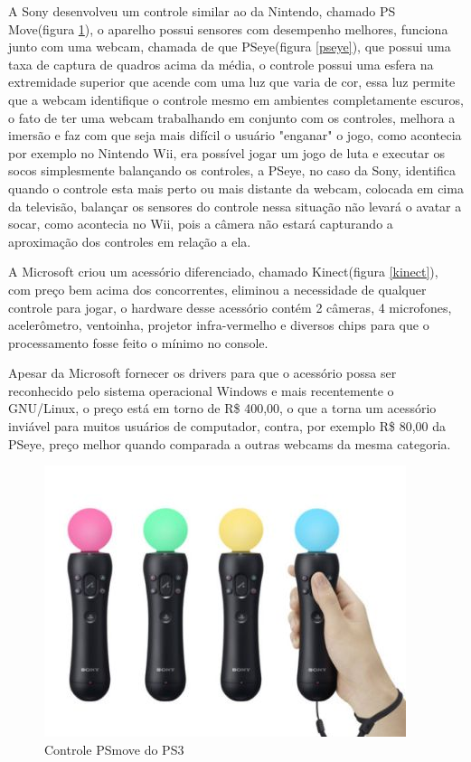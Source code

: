 A Sony desenvolveu um controle similar ao da Nintendo, chamado PS Move(figura \ref{psmove}), o aparelho possui sensores com desempenho melhores, funciona junto com uma webcam,
chamada de que PSeye(figura \ref{pseye}), que
possui uma taxa de captura de quadros acima da média, o controle possui uma esfera na extremidade superior que acende com uma luz que varia de cor, essa luz
permite que a webcam identifique o controle mesmo em ambientes completamente escuros, o fato de ter uma webcam trabalhando em conjunto com os controles, melhora
a imersão e faz com que seja mais difícil o usuário "enganar" o jogo, como acontecia por exemplo no Nintendo Wii, era possível jogar um jogo de luta e executar
os socos simplesmente balançando os controles, a PSeye, no caso da Sony, identifica quando o controle esta mais perto ou mais distante da webcam, colocada em
cima da televisão, balançar os sensores do controle nessa situação não levará o avatar a socar, como acontecia no Wii, pois a câmera não estará capturando a
aproximação dos controles em relação a ela.\cite{MotionGamingReview}

A Microsoft criou um acessório diferenciado, chamado Kinect(figura \ref{kinect}), com preço bem acima dos concorrentes, eliminou a necessidade de qualquer controle para jogar, o hardware desse
acessório contém 2 câmeras, 4 microfones, acelerômetro, ventoinha, projetor infra-vermelho e diversos chips para que o processamento fosse feito o mínimo no
console.\cite{InsideKinect}

Apesar da Microsoft fornecer os drivers para que o acessório possa ser reconhecido pelo sistema operacional Windows e mais recentemente o GNU/Linux, o preço está
em torno de R\$ 400,00, o que a torna um acessório inviável para muitos usuários de computador,  contra, por exemplo R\$ 80,00 da PSeye,
preço melhor quando comparada a outras webcams da mesma categoria.

\begin{figure}[h]
    \center
    \includegraphics[scale=0.45]{imagens/psmove.jpg}

    \caption{Controle PSmove do PS3}
    \label{psmove}
\end{figure}

